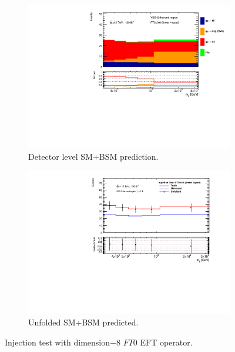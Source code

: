 \begin{figure}[htb]
    \centering
    \begin{subfigure}{.48\textwidth}
        \centering
        \includegraphics[width=.9\linewidth]{figures/Analysis/Unfolding/injection_test_FT0_quad_mjj_detectorPred.pdf}
        \caption{ Detector level SM+BSM prediction. \label{fig:Dim8cont} }
    \end{subfigure}
    \begin{subfigure}{.48\textwidth}
        \centering
        \includegraphics[width=.9\linewidth]{figures/Analysis/Unfolding/injection_test_FT0_quad_mjj.pdf}
        \caption{Unfolded SM+BSM predicted. \label{fig:InjectTestResult}}
    \end{subfigure}
    \caption{ Injection test with  dimension$-8$ $FT0$ EFT operator. \label{fig:injection_test_FT0_quad}}
\end{figure}

